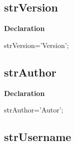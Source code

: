 \documentclass{report}
\newif\ifpdf
\begin{document}
\subsection*{strVersion}
\fi
\label{trstrings-strVersion}
\begin{list}{}{
\setlength{\itemindent}{0cm}
\setlength{\listparindent}{0cm}
\setlength{\leftmargin}{\evensidemargin}
\addtolength{\leftmargin}{\tmplength}
\settowidth{\labelsep}{X}
\addtolength{\leftmargin}{\labelsep}
\setlength{\labelwidth}{\tmplength}
}
\item[\textbf{Declaration}\hfill]
\ifpdf
\begin{flushleft}
\fi
\begin{ttfamily}
strVersion='Version';\end{ttfamily}

\ifpdf
\end{flushleft}
\fi

\end{list}
\ifpdf
\subsection*{\large{\textbf{strAuthor}}\normalsize\hspace{1ex}\hrulefill}
\else
\subsection*{strAuthor}
\fi
\label{trstrings-strAuthor}
\begin{list}{}{
\setlength{\itemindent}{0cm}
\setlength{\listparindent}{0cm}
\setlength{\leftmargin}{\evensidemargin}
\addtolength{\leftmargin}{\tmplength}
\settowidth{\labelsep}{X}
\addtolength{\leftmargin}{\labelsep}
\setlength{\labelwidth}{\tmplength}
}
\item[\textbf{Declaration}\hfill]
\ifpdf
\begin{flushleft}
\fi
\begin{ttfamily}
strAuthor='Autor';\end{ttfamily}

\ifpdf
\end{flushleft}
\fi

\end{list}
\ifpdf
\subsection*{\large{\textbf{strUsername}}\normalsize\hspace{1ex}\hrulefill}
\else
\end{document}
